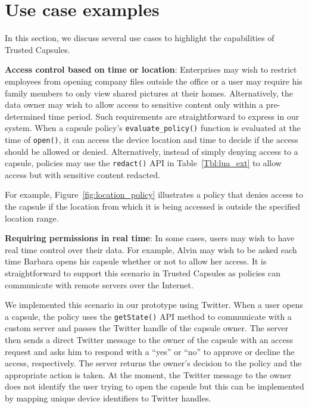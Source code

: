 \chapter{Use case examples}
\label{sec:new-policies}

In this section, we discuss several use cases to highlight the capabilities of
Trusted Capsules.



\textbf{Access control based on time or location}: Enterprises may wish to
restrict employees from opening company files outside the office or a user may
require his family members to only view shared pictures at their
homes. Alternatively, the data owner may wish to allow access to sensitive
content only within a pre-determined time period. Such requirements are
straightforward to express in our system. When a capsule policy's
\texttt{evaluate\_policy()} function is evaluated at the time of
\texttt{open()}, it can access the device location and time to decide if the
access should be allowed or denied. Alternatively, instead of simply denying access
to a capsule, policies may use the \texttt{redact()} API in
Table~\ref{Tbl:lua_ext} to allow access but with sensitive content
redacted.

For example, Figure~\ref{fig:location_policy} illustrates a policy
that denies access to the capsule if the location from which it is
being accessed is outside the specified location range. 

\textbf{Requiring permissions in real time}: In some cases, users may wish to
have real time control over their data. For example, Alvin may wish to be asked
each time Barbara opens his capsule whether or not to allow her access. It is
straightforward to support this scenario in Trusted Capsules as policies can
communicate with remote servers over the Internet.

We implemented this scenario in our prototype using Twitter. When a user opens a capsule,
the policy uses the \texttt{getState()} API method to communicate with a custom
server and passes the Twitter handle of the capsule owner. The server then sends
a direct Twitter message to the owner of the capsule with an access request
and asks him to respond with a ``yes'' or ``no'' to approve or decline the access,
respectively. The server returns the owner's decision to the policy and the
appropriate action is taken. At the moment, the Twitter message to the owner
does not identify the user trying to open the capsule but this can be
implemented by mapping unique device identifiers to Twitter handles.

